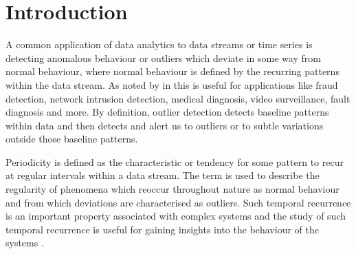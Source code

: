 \documentclass[preprints,article,accept,pdftex,moreauthors]{Definitions/mdpi}
\begin{document}
\def\x{{\mathbf x}}
\def\L{{\cal L}}



\section{Introduction}

A common application of data analytics to data streams or  time series is  detecting anomalous behaviour or outliers which deviate in some way from normal behaviour, where normal behaviour is defined by the recurring patterns within {the} data stream.
%
As noted by \citeauthor{a15110429} in \cite{a15110429} this is useful for applications like  fraud detection, network intrusion detection, medical diagnosis, video surveillance,  fault diagnosis and more.
%
By definition, outlier detection detects baseline patterns within  data and then detects and alert us to outliers or {to} subtle variations outside those baseline patterns.

Periodicity  is defined as the characteristic or tendency for some pattern to recur at regular intervals within a data stream. The term is used to describe the regularity  of phenomena which reoccur throughout nature as normal behaviour and from which deviations are characterised as outliers. 
Such temporal recurrence is an important property associated with complex systems and the study of such temporal recurrence is useful for gaining insights into the behaviour of {the}  systems \cite{10.1093/cz/zoz016}.
\end{document}

